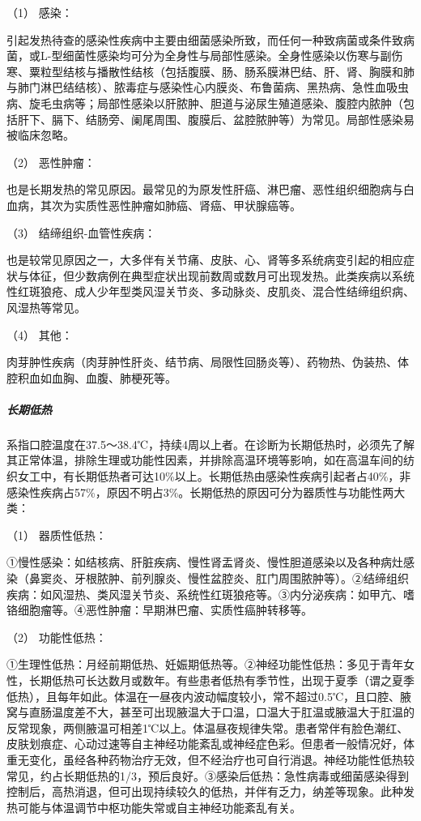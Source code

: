 \hypertarget{text00008.htmlux5cux23CHP1-1-2-4-2-1}{}
（1） 感染：

引起发热待查的感染性疾病中主要由细菌感染所致，而任何一种致病菌或条件致病菌，或L-型细菌性感染均可分为全身性与局部性感染。全身性感染以伤寒与副伤寒、粟粒型结核与播散性结核（包括腹膜、肠、肠系膜淋巴结、肝、肾、胸膜和肺与肺门淋巴结结核）、脓毒症与感染性心内膜炎、布鲁菌病、黑热病、急性血吸虫病、旋毛虫病等；局部性感染以肝脓肿、胆道与泌尿生殖道感染、腹腔内脓肿（包括肝下、膈下、结肠旁、阑尾周围、腹膜后、盆腔脓肿等）为常见。局部性感染易被临床忽略。

\hypertarget{text00008.htmlux5cux23CHP1-1-2-4-2-2}{}
（2） 恶性肿瘤：

也是长期发热的常见原因。最常见的为原发性肝癌、淋巴瘤、恶性组织细胞病与白血病，其次为实质性恶性肿瘤如肺癌、肾癌、甲状腺癌等。

\hypertarget{text00008.htmlux5cux23CHP1-1-2-4-2-3}{}
（3） 结缔组织-血管性疾病：

也是较常见原因之一，大多伴有关节痛、皮肤、心、肾等多系统病变引起的相应症状与体征，但少数病例在典型症状出现前数周或数月可出现发热。此类疾病以系统性红斑狼疮、成人少年型类风湿关节炎、多动脉炎、皮肌炎、混合性结缔组织病、风湿热等常见。

\hypertarget{text00008.htmlux5cux23CHP1-1-2-4-2-4}{}
（4） 其他：

肉芽肿性疾病（肉芽肿性肝炎、结节病、局限性回肠炎等）、药物热、伪装热、体腔积血如血胸、血腹、肺梗死等。

\subparagraph{长期低热}

系指口腔温度在37.5～38.4℃，持续4周以上者。在诊断为长期低热时，必须先了解其正常体温，排除生理或功能性因素，并排除高温环境等影响，如在高温车间的纺织女工中，有长期低热者可达10\%以上。长期低热由感染性疾病引起者占40\%，非感染性疾病占57\%，原因不明占3\%。长期低热的原因可分为器质性与功能性两大类：

\hypertarget{text00008.htmlux5cux23CHP1-1-2-4-3-1}{}
（1） 器质性低热：

①慢性感染：如结核病、肝脏疾病、慢性肾盂肾炎、慢性胆道感染以及各种病灶感染（鼻窦炎、牙根脓肿、前列腺炎、慢性盆腔炎、肛门周围脓肿等）。②结缔组织疾病：如风湿热、类风湿关节炎、系统性红斑狼疮等。③内分泌疾病：如甲亢、嗜铬细胞瘤等。④恶性肿瘤：早期淋巴瘤、实质性癌肿转移等。

\hypertarget{text00008.htmlux5cux23CHP1-1-2-4-3-2}{}
（2） 功能性低热：

①生理性低热：月经前期低热、妊娠期低热等。②神经功能性低热：多见于青年女性，长期低热可长达数月或数年。有些患者低热有季节性，出现于夏季（谓之夏季低热），且每年如此。体温在一昼夜内波动幅度较小，常不超过0.5℃，且口腔、腋窝与直肠温度差不大，甚至可出现腋温大于口温，口温大于肛温或腋温大于肛温的反常现象，两侧腋温可相差1℃以上。体温昼夜规律失常。患者常伴有脸色潮红、皮肤划痕症、心动过速等自主神经功能紊乱或神经症色彩。但患者一般情况好，体重无变化，虽经各种药物治疗无效，但不经治疗也可自行消退。神经功能性低热较常见，约占长期低热的1/3，预后良好。③感染后低热：急性病毒或细菌感染得到控制后，高热消退，但可出现持续较久的低热，并伴有乏力，纳差等现象。此种发热可能与体温调节中枢功能失常或自主神经功能紊乱有关。

